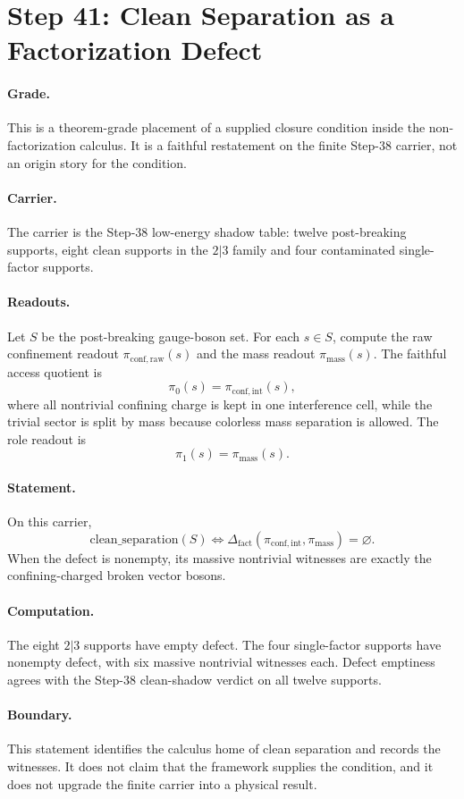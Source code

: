 \section*{Step 41: Clean Separation as a Factorization Defect}

\paragraph{Grade.}
This is a theorem-grade placement of a supplied closure condition inside the non-factorization calculus. It is a faithful restatement on the finite Step-38 carrier, not an origin story for the condition.

\paragraph{Carrier.}
The carrier is the Step-38 low-energy shadow table: twelve post-breaking supports, eight clean supports in the \(2|3\) family and four contaminated single-factor supports.

\paragraph{Readouts.}
Let \(S\) be the post-breaking gauge-boson set. For each \(s \in S\), compute the raw confinement readout \(\pi_{\mathrm{conf,raw}}(s)\) and the mass readout \(\pi_{\mathrm{mass}}(s)\). The faithful access quotient is
\[
\pi_0(s)=\pi_{\mathrm{conf,int}}(s),
\]
where all nontrivial confining charge is kept in one interference cell, while the trivial sector is split by mass because colorless mass separation is allowed. The role readout is
\[
\pi_1(s)=\pi_{\mathrm{mass}}(s).
\]

\paragraph{Statement.}
On this carrier,
\[
\mathrm{clean\_separation}(S)
\Longleftrightarrow
\Delta_{\mathrm{fact}}(\pi_{\mathrm{conf,int}},\pi_{\mathrm{mass}})=\varnothing.
\]
When the defect is nonempty, its massive nontrivial witnesses are exactly the confining-charged broken vector bosons.

\paragraph{Computation.}
The eight \(2|3\) supports have empty defect. The four single-factor supports have nonempty defect, with six massive nontrivial witnesses each. Defect emptiness agrees with the Step-38 clean-shadow verdict on all twelve supports.

\paragraph{Boundary.}
This statement identifies the calculus home of clean separation and records the witnesses. It does not claim that the framework supplies the condition, and it does not upgrade the finite carrier into a physical result.
